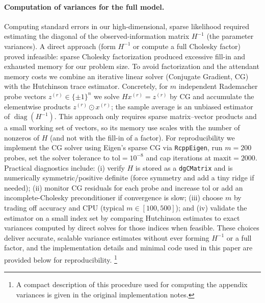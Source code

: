 \paragraph{Computation of variances for the full model.}
Computing standard errors in our high-dimensional, sparse likelihood required estimating the diagonal
of the observed-information matrix \(H^{-1}\) (the parameter variances). A direct approach (form \(H^{-1}\)
or compute a full Cholesky factor) proved infeasible: sparse Cholesky factorization produced excessive
fill-in and exhausted memory for our problem size. To avoid factorization and the attendant memory
costs we combine an iterative linear solver (Conjugate Gradient, CG) with the Hutchinson trace estimator.
Concretely, for \(m\) independent Rademacher probe vectors \(z^{(r)}\in\{\pm 1\}^n\) we solve
\(H x^{(r)} = z^{(r)}\) by CG and accumulate the elementwise products \(z^{(r)}\odot x^{(r)}\); the
sample average is an unbiased estimator of \(\operatorname{diag}(H^{-1})\). This approach only requires
sparse matrix–vector products and a small working set of vectors, so its memory use scales with the
number of nonzeros of \(H\) (and not with the fill-in of a factor). For reproducibility we implement the
CG solver using Eigen’s sparse CG via \texttt{RcppEigen}, run \(m=200\) probes, set the solver tolerance
to \(\text{tol}=10^{-8}\) and cap iterations at \(\text{maxit}=2000\). Practical diagnostics include: (i)
verify \(H\) is stored as a \texttt{dgCMatrix} and is numerically symmetric/positive definite (force
symmetry and add a tiny ridge if needed); (ii) monitor CG residuals for each probe and increase \(\text{tol}\)
or add an incomplete-Cholesky preconditioner if convergence is slow; (iii) choose \(m\) by trading off
accuracy and CPU (typical \(m\in[100,500]\)); and (iv) validate the estimator on a small index set by
comparing Hutchinson estimates to exact variances computed by direct solves for those indices when feasible.
These choices deliver accurate, scalable variance estimates without ever forming \(H^{-1}\) or a full factor,
and the implementation details and minimal code used in this paper are provided below for reproducibility.%
\footnote{A compact description of this procedure used for computing the appendix variances is given in the
original implementation notes.} 
